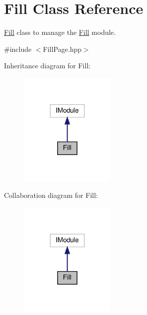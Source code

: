 \hypertarget{class_fill}{}\section{Fill Class Reference}
\label{class_fill}


\hyperlink{class_fill}{Fill} class to manage the \hyperlink{class_fill}{Fill} module.  




{\ttfamily \#include $<$Fill\+Page.\+hpp$>$}



Inheritance diagram for Fill\+:\nopagebreak
\begin{figure}[H]
\begin{center}
\leavevmode
\includegraphics[width=131pt]{class_fill__inherit__graph}
\end{center}
\end{figure}


Collaboration diagram for Fill\+:\nopagebreak
\begin{figure}[H]
\begin{center}
\leavevmode
\includegraphics[width=131pt]{class_fill__coll__graph}
\end{center}
\end{figure}
